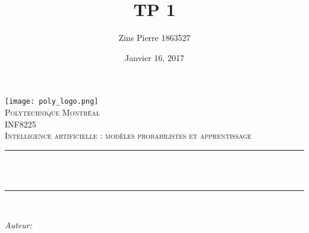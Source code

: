 \documentclass[12pt]{article}
\title{TP 1}                %
\author{Zins Pierre 1863527}            %
\date{Janvier 16, 2017}             %
\makeatletter
\let\thetitle\@title
\let\theauthor\@author
\let\thedate\@date
\makeatother
\begin{document}

\begin{titlepage}
  \centering
    \vspace*{0.5 cm}
    \texttt{[image: poly\_logo.png]}\\[1.0 cm]  %
    \textsc{\LARGE Polytechnique Montréal}\\[2.0 cm]  %
  \textsc{\Large INF8225 }\\[0.5 cm]        %
  \textsc{Intelligence artificielle : modèles probabilistes et apprentissage}\\[0.5 cm]       %
  \rule{\linewidth}{0.2 mm} \\[0.4 cm]
  { \huge \bfseries \thetitle}\\
  \rule{\linewidth}{0.2 mm} \\[1.5 cm]
  
  \begin{minipage}{0.4\textwidth}
    \begin{flushleft} \large
      \emph{Auteur:}\\
      \theauthor
      \end{flushleft}
      \end{minipage}~
      \begin{minipage}{0.4\textwidth}
      \begin{flushright} \large
    \end{flushright}
  \end{minipage}\\[2 cm]
  
  {\large \thedate}\\[2 cm]
 
  \vfill
  
\end{titlepage}


\tableofcontents
\pagebreak


\end{document}
